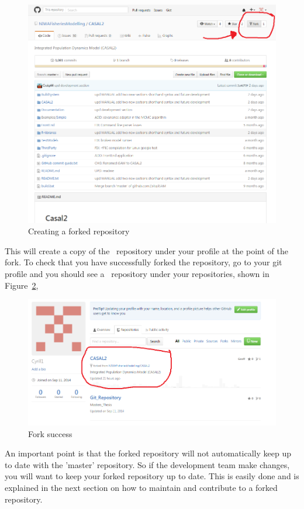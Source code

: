\begin{figure}[!ht]
	\includegraphics[scale=0.6]{Figures/Fork_button.png}
	\caption{Creating a forked repository}\label{fig:fork}
\end{figure}
\pagebreak
This will create a copy of the \CNAME\ repository under your profile at the point of the fork. To check that you have successfully forked the repository, go to your git profile and you should see a \CNAME\ repository under your repositories, shown in Figure~\ref{fig:fork_success},

\begin{figure}[!ht]
	\includegraphics[scale=0.6]{Figures/Fork_success.png}
	\caption{Fork success}\label{fig:fork_success}
\end{figure}

An important point is that the forked repository will not automatically keep up to date with the 'master' repository. So if the development team make changes, you will want to keep your forked repository up to date. This is easily done and is explained in the next section on how to maintain and contribute to a forked repository.


